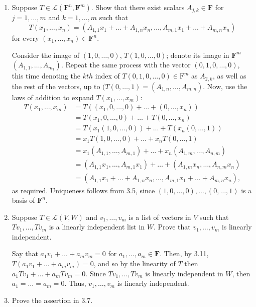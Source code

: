 \documentclass{book}
\begin{document}
\begin{enumerate}
\item Suppose \(T \in \mathcal{L}(\textbf{F}^n,\textbf{F}^m)\).  Show that there exist scalars \(A_{j,k} \in \textbf{F}\) for \(j=1,\dots,m\) and \(k=1,\dots,m\) such that \[T(x_1,\dots,x_n)=(A_{1,1}x_1+\dots+A_{1,n}x_n,\dots,A_{m,1}x_1+\dots+A_{m,n}x_n)\] for every \((x_1,\dots,x_n) \in \textbf{F}^n\).

Consider the image of \((1,0,\dots,0)\), \(T(1,0,\dots,0)\); denote its image in \(\textbf{F}^m\) \((A_{1,1},\dots,A_{m_1})\).  Repeat the same process with the vector \((0,1,0,\dots,0)\), this time denoting the \(kth\) index of \(T(0,1,0,\dots,0) \in \textrm{F}^m\) as \(A_{2,k}\), as well as the rest of the vectors, up to \((T(0,\dots,1)=(A_{1,n},\dots,A_{m,n})\).  Now, use the laws of addition to expand \(T(x_1,\dots,x_m)\):
\begin{equation*}
\begin{split}
T(x_1,\dots,x_m) &=T((x_1,0,\dots,0)+\dots+(0,\dots,x_n)) \\
&= T(x_1,0,\dots,0)+\dots+T(0,\dots,x_n) \\
&= T(x_1(1,0,\dots,0))+\dots+T(x_n(0,\dots,1)) \\
&= x_1T(1,0,\dots,0)+\dots+x_nT(0,\dots,1) \\
&= x_1(A_{1,1},\dots,A_{m,1})+\dots+x_n(A_{1,m},\dots,A_{n,m}) \\
&= (A_{1,1}x_1,\dots,A_{m,1}x_1)+\dots+(A_{1,m}x_n,\dots,A_{n,m}x_n) \\
&= (A_{1,1}x_1+\dots+A_{1,n}x_n,\dots,A_{m,1}x_1+\dots+A_{m,n}x_n),
\end{split}
\end{equation*}
as required.  Uniqueness follows from 3.5, since \((1,0,\dots,0),\dots,(0,\dots,1)\) is a basis of \(\textbf{F}^n\).

\item Suppose \(T \in \mathcal{L}(V,W)\) and \(v_1,\dots,v_m\) is a list of vectors in \(V\) such that \(Tv_1,\dots,Tv_m\) is a linearly independent list in \(W\).  Prove that \(v_1,\dots,v_m\) is linearly independent.

Say that \(a_1v_1+\dots+a_mv_m=0\) for \(a_1,\dots,a_m \in \textbf{F}\).  Then, by 3.11, \(T(a_1v_1+\dots+a_mv_m)=0\), and so by the linearity of \(T\) then \(a_1Tv_1+\dots+a_mTv_m=0\).  Since \(Tv_1,\dots,Tv_m\) is linearly independent in \(W\), then \(a_1=\dots=a_m=0\).  Thus, \(v_1,\dots,v_m\) is linearly independent.

\item Prove the assertion in 3.7.


\end{enumerate}
\end{document}
